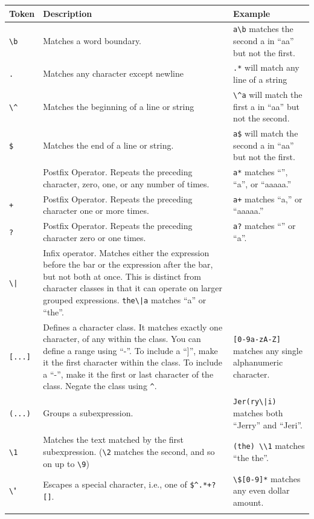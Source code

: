 \documentclass[10pt]{book}
\begin{document}
\begin{tabular}{l | l | l}
\hline
Token & Description & Example \\ \hline
\verb"\b" & Matches a word boundary. & \verb"a\b" matches the second a in ``aa'' but not the first. \\ \hline
{\tt .} & Matches any character except newline & {\tt .*} will match any line of a string \\ \hline
\verb"\^" & Matches the beginning of a line or string & \verb"\^a" will match the first a in ``aa'' but not the second. \\ \hline
{\tt \$} & Matches the end of a line or string. & {\tt a\$} will match the second a in ``aa'' but not the first. \\ \hline
{\tt *} & Postfix Operator. Repeats the preceding character, zero, one, or any number of times. & {\tt a*} matches ``'', ``a'', or ``aaaaa.''\\ \hline
{\tt +} & Postfix Operator. Repeats the preceding character one or more times. & {\tt a+} matches ``a,'' or ``aaaaa.''\\ \hline
{\tt ?} & Postfix Operator. Repeats the preceding character zero or one times. & {\tt a?} matches ``'' or ``a''.\\ \hline
\verb"\|" & Infix operator. Matches either the expression before the bar or the expression after the bar, but not both at once. This is distinct from character classes in that it can operate on larger grouped expressions.  \verb"the\|a" matches ``a'' or ``the''. \\ \hline
\verb"[...]" & Defines a character class. It matches exactly one character, of any within the class. You can define a range using ``-''. To include a ``]'', make it the first character within the class. To include a ``-'', make it the first or last character of the class. Negate the class using \verb"^". & \verb"[0-9a-zA-Z]" matches any single alphanumeric character. \\ \hline
\verb"(...)" & Groups a subexpression. & \verb"Jer(ry\|i)" matches both ``Jerry'' and ``Jeri''. \\ \hline
\verb"\1" & Matches the text matched by the first subexpression. (\verb"\2" matches the second, and so on up to \verb"\9") & \verb"(the) \\1" matches ``the the''. \\ \hline
\verb"\" & Escapes a special character, i.e., one of \verb"$^.*+?[]". & \verb"\$[0-9]*" matches any even dollar amount. \\ \hline
\label{tab:regex}
\end{tabular}
\end{document}
